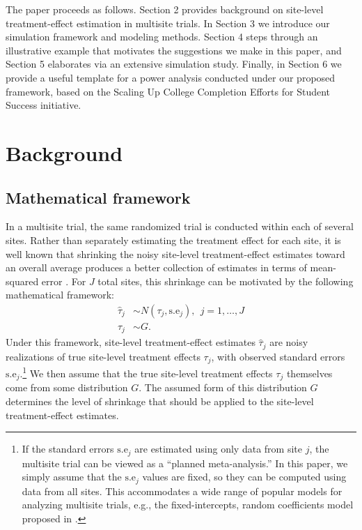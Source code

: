 \documentclass[]{article}
\begin{document}
The paper proceeds as follows.
Section 2 provides background on site-level treatment-effect estimation in multisite trials.
In Section 3 we introduce our simulation framework and modeling methods.
Section 4 steps through an illustrative example that motivates the suggestions we make in this paper, and Section 5 elaborates via an extensive simulation study.
Finally, in Section 6 we provide a useful template for a power analysis conducted under our proposed framework, based on the Scaling Up College Completion Efforts for Student Success initiative.


\section{Background}

\subsection{Mathematical framework}

In a multisite trial, the same randomized trial is conducted within each of several sites.
Rather than separately estimating the treatment effect for each site, it is well known that shrinking the noisy site-level treatment-effect estimates toward an overall average produces a better collection of estimates in terms of mean-squared error \citep{james1961estimation}.
For $J$ total sites, this shrinkage can be motivated by the following mathematical framework:
\begin{align*}
    \hat{\tau}_j &\sim N(\tau_j, \text{s.e}_j), \ \ j=1,\dots,J \\
    \tau_j &\sim G.
\end{align*}
Under this framework, site-level treatment-effect estimates $\hat{\tau}_j$ are noisy realizations of true site-level treatment effects $\tau_j$, with observed standard errors $\text{s.e}_j$.\footnote{If the standard errors $\text{s.e}_j$ are estimated using only data from site $j$, the multisite trial can be viewed as a ``planned meta-analysis.''
In this paper, we simply assume that the $\text{s.e}_j$ values are fixed, so they can be computed using data from all sites.
This accommodates a wide range of popular models for analyzing multisite trials, e.g., the fixed-intercepts, random coefficients model proposed in \cite{bloom2017using}.}
We then assume that the true site-level treatment effects $\tau_j$ themselves come from some distribution $G$.
The assumed form of this distribution $G$ determines the level of shrinkage that should be applied to the site-level treatment-effect estimates.
\end{document}
